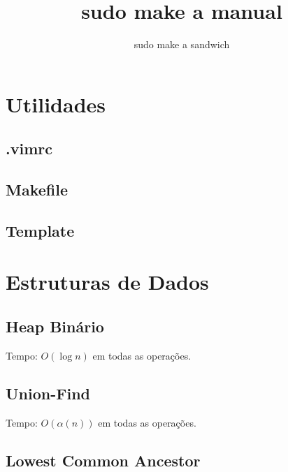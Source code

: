 \documentclass[12pt,a4paper]{article}
\title{sudo make a manual}
\author{sudo make a sandwich}
\begin{document}
	\twocolumn
	\maketitle
	\tableofcontents
	\onecolumn

	\section{Utilidades}
		\subsection{.vimrc}
			
		\subsection{Makefile}
			
		\subsection{Template}
			
	
	\section{Estruturas de Dados}
		\subsection{Heap Binário}
			Tempo: \( O(\log n) \) em todas as operações.
			
		\subsection{Union-Find}
			Tempo: \( O(\alpha(n)) \) em todas as operações.
			
		\subsection{Lowest Common Ancestor}
\end{document}
